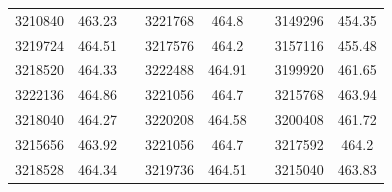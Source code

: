 \documentclass[12pt]{mwart}
\begin{document}
\begin{table}[H]
\begin{tabular}{cclcclcc}
		3210840                                                  & 463.23                                                        &  & 3221768                                                  & 464.8                                                         &  & 3149296                                                  & 454.35                                                        \\
		3219724                                                  & 464.51                                                        &  & 3217576                                                  & 464.2                                                         &  & 3157116                                                  & 455.48                                                        \\
		3218520                                                  & 464.33                                                        &  & 3222488                                                  & 464.91                                                        &  & 3199920                                                  & 461.65                                                        \\
		3222136                                                  & 464.86                                                        &  & 3221056                                                  & 464.7                                                         &  & 3215768                                                  & 463.94                                                        \\
		3218040                                                  & 464.27                                                        &  & 3220208                                                  & 464.58                                                        &  & 3200408                                                  & 461.72                                                        \\
		3215656                                                  & 463.92                                                        &  & 3221056                                                  & 464.7                                                         &  & 3217592                                                  & 464.2                                                         \\
		3218528                                                  & 464.34                                                        &  & 3219736                                                  & 464.51                                                        &  & 3215040                                                  & 463.83                                                        \\

\end{tabular}
\end{table}
\end{document}
